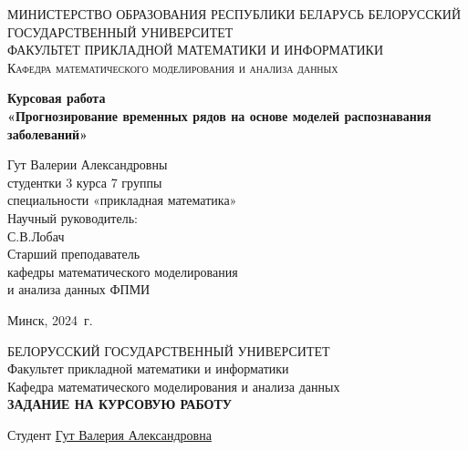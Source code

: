 \documentclass[a4paper, 12pt]{extarticle}
\numberwithin{equation}{section}
\begin{document}
	\def\contentsname{ОГЛАВЛЕНИЕ}
	
	\begin{titlepage}
		\begin{center}
			\textsc{МИНИСТЕРСТВО ОБРАЗОВАНИЯ РЕСПУБЛИКИ БЕЛАРУСЬ БЕЛОРУССКИЙ ГОСУДАРСТВЕННЫЙ УНИВЕРСИТЕТ
				\\[5mm]
				ФАКУЛЬТЕТ ПРИКЛАДНОЙ МАТЕМАТИКИ И ИНФОРМАТИКИ\\[2mm]
				Кафедра математического моделирования и анализа данных
			}
			
			\vfill
			
			\textbf{Курсовая работа
				\\[3mm]
				«Прогнозирование временных рядов на основе моделей распознавания заболеваний»
				\\[26mm]
			}
		\end{center}
		
		\hfill
		\begin{minipage}{.5\textwidth}
			\begin{flushright}
				Гут Валерии Александровны\\
				студентки 3 курса 7 группы\\
				специальности «прикладная математика»\\[5mm]
				
				Научный руководитель:\\[2mm] 
				С.В.Лобач\\
				Старший преподаватель\\
				кафедры математического моделирования\\
				и анализа данных ФПМИ
				
			\end{flushright}
		\end{minipage}%
		\vfill
		\begin{center}
			Минск, 2024\ г.
		\end{center}
	\end{titlepage}
	\newpage
	\setcounter{page}{2}
	\begin{center}
		\large{БЕЛОРУССКИЙ ГОСУДАРСТВЕННЫЙ УНИВЕРСИТЕТ}
		\\[2mm]
		Факультет прикладной математики и информатики\\[5mm]
		Кафедра математического моделирования и анализа данных\\[5mm]
		\large{\textbf{ЗАДАНИЕ НА КУРСОВУЮ РАБОТУ\\[20mm]}}
	\end{center}
	Студент \quad \underline{Гут Валерия Александровна\hspace*{\linegoal}}\\[2mm]
\end{document}
